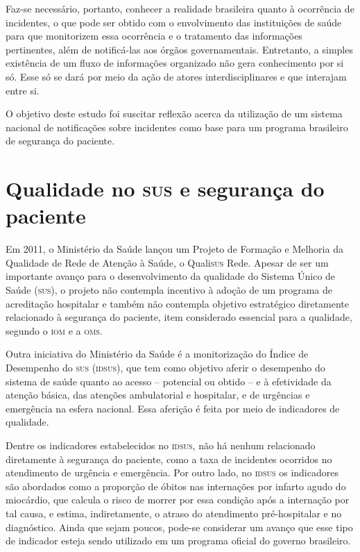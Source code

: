 \documentclass{article}
\begin{document}

Faz-se necessário, portanto, conhecer a realidade brasileira quanto à ocorrência de
        incidentes, o que pode ser obtido com o envolvimento das instituições de saúde para que
        monitorizem essa ocorrência e o tratamento das informações pertinentes, além de notificá-las
        aos órgãos governamentais. Entretanto, a simples existência de um fluxo de informações
        organizado não gera conhecimento por si só. Esse só se dará por meio da ação de atores
        interdisciplinares e que interajam entre si. %


O objetivo deste estudo foi suscitar reflexão acerca da utilização de um sistema nacional
        de notificações sobre incidentes como base para um programa brasileiro de segurança do
        paciente.

\section{%
Qualidade no \textsc{sus} e segurança do paciente}

Em 2011, o Ministério da Saúde lançou um Projeto de Formação e Melhoria da Qualidade de
        Rede de Atenção à Saúde, o Quali\textsc{sus} Rede. %
 Apesar de ser um importante avanço para o desenvolvimento da qualidade do Sistema
        Único de Saúde (\textsc{sus}), o projeto não contempla incentivo à adoção de um programa de
        acreditação hospitalar e também não contempla objetivo estratégico diretamente relacionado à
        segurança do paciente, item considerado essencial para a qualidade, segundo o \textsc{iom} e a
        \textsc{oms}.

Outra iniciativa do Ministério da Saúde é a monitorização do Índice de Desempenho do \textsc{sus}
        (\textsc{idsus}), que tem como objetivo aferir o desempenho do sistema de saúde quanto ao acesso –
        potencial ou obtido – e à efetividade da atenção básica, das atenções ambulatorial e
        hospitalar, e de urgências e emergência na esfera nacional. %
 Essa aferição é feita por meio de indicadores de qualidade.

Dentre os indicadores estabelecidos no \textsc{idsus}, não há nenhum relacionado diretamente à
        segurança do paciente, como a taxa de incidentes ocorridos no atendimento de urgência e
        emergência. Por outro lado, no \textsc{idsus} os indicadores são abordados como a proporção de óbitos
        nas internações por infarto agudo do miocárdio, que calcula o risco de morrer por essa
        condição após a internação por tal causa, e estima, indiretamente, o atraso do atendimento
        pré-hospitalar e no diagnóstico. %
 Ainda que sejam poucos, pode-se considerar um avanço que esse tipo de indicador
        esteja sendo utilizado em um programa oficial do governo brasileiro.
\end{document}
